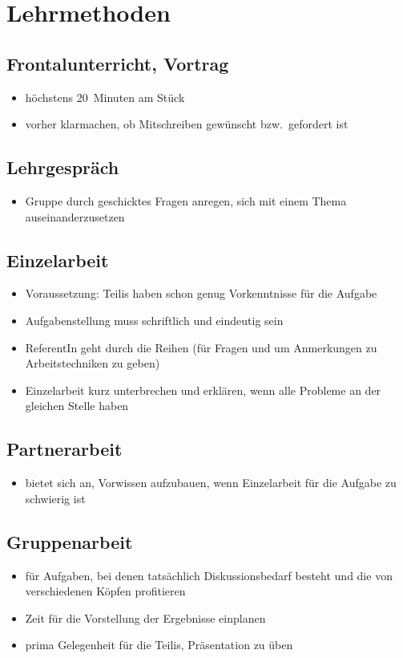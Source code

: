 \chapter{Lehrmethoden}
\label{lehrmethoden}


\section{Frontalunterricht, Vortrag}
\begin{itemize}
    \item höchstens 20~Minuten am Stück
    \item vorher klarmachen, ob Mitschreiben gewünscht bzw.~gefordert ist
\end{itemize}


\section{Lehrgespräch}
\begin{itemize}
    \item Gruppe durch geschicktes Fragen anregen, sich mit einem Thema auseinanderzusetzen
\end{itemize}


\section{Einzelarbeit}
\begin{itemize}
    \item Voraussetzung: Teilis haben schon genug Vorkenntnisse für die Aufgabe
    \item Aufgabenstellung muss schriftlich und eindeutig sein
    \item ReferentIn geht durch die Reihen (für Fragen und um Anmerkungen zu Arbeitstechniken zu geben)
    \item Einzelarbeit kurz unterbrechen und erklären, wenn alle Probleme an der gleichen Stelle haben
\end{itemize}


\section{Partnerarbeit}
\begin{itemize}
    \item bietet sich an, Vorwissen aufzubauen, wenn Einzelarbeit für die Aufgabe zu schwierig ist
\end{itemize}


\section{Gruppenarbeit}
\begin{itemize}
    \item für Aufgaben, bei denen tatsächlich Diskussionsbedarf besteht und die von \glqq verschiedenen Köpfen\grqq{} profitieren
    \item Zeit für die Vorstellung der Ergebnisse einplanen
    \item prima Gelegenheit für die Teilis, Präsentation zu üben
\end{itemize}


